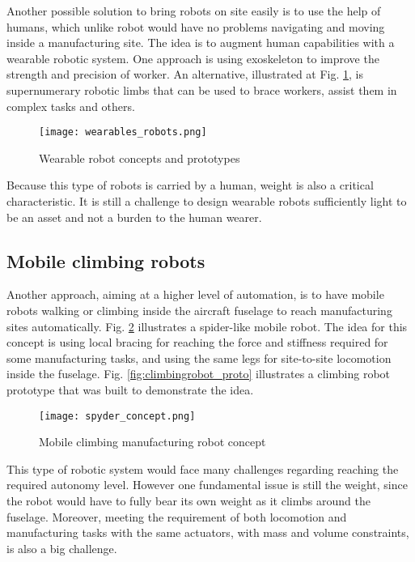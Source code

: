 Another possible solution to bring robots on site easily is to use the help of humans, which unlike robot would have no problems navigating and moving inside a manufacturing site. The idea is to augment human capabilities with a wearable robotic system. One approach is using exoskeleton to improve the strength and precision of worker. An alternative, illustrated at Fig. \ref{fig:wearable_concept}, is supernumerary robotic limbs that can be used to brace workers, assist them in complex tasks and others. 

\begin{figure}[H]
	\centering
		\texttt{[image: wearables\_robots.png]}
		\caption[Wearable robot concepts and prototypes]{Wearable robot concepts and prototypes \cite{bonilla_robot_2014} \cite{parietti_supernumerary_2016} \cite{wu_hold-and-manipulate_2015} }
	\label{fig:wearable_concept}
\end{figure}

Because this type of robots is carried by a human, weight is also a critical characteristic. It is still a challenge to design wearable robots sufficiently light to be an asset and not a burden to the human wearer.


\subsection{Mobile climbing robots}
\label{sec:MobileClimbingRobots}

Another approach, aiming at a higher level of automation, is to have mobile robots walking or climbing inside the aircraft fuselage to reach manufacturing sites automatically. Fig. \ref{fig:climbingrobot} illustrates a spider-like mobile robot. The idea for this concept is using local bracing for reaching the force and stiffness required for some manufacturing tasks, and using the same legs for site-to-site locomotion inside the fuselage. Fig. \ref{fig:climbingrobot_proto} illustrates a climbing robot prototype that was built to demonstrate the idea.

\begin{figure}[htp]
	\centering
		\texttt{[image: spyder\_concept.png]}
		\caption{Mobile climbing manufacturing robot concept}
	\label{fig:climbingrobot}
\end{figure}

This type of robotic system would face many challenges regarding reaching the required autonomy level. However one fundamental issue is still the weight, since the robot would have to fully bear its own weight as it climbs around the fuselage. Moreover, meeting the requirement of both locomotion and manufacturing tasks with the same actuators, with mass and volume constraints, is also a big challenge. 

